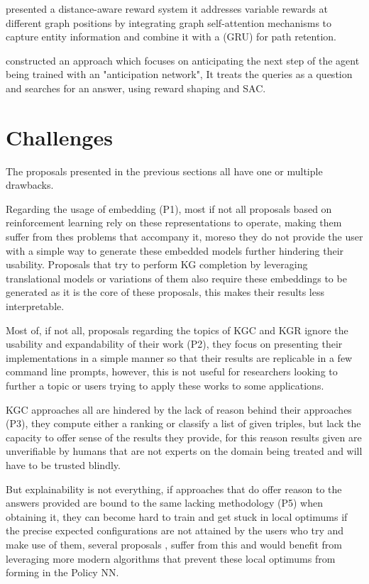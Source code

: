 \citet{tiwari2021dapath} presented a distance-aware reward system it addresses variable rewards at different graph positions by integrating graph self-attention mechanisms to capture entity information and combine it with a (GRU) for path retention.

\citet{cui2023incorporating} constructed an approach which focuses on anticipating the next step of the agent being trained with an "anticipation network", It treats the queries as a question and searches for an answer, using reward shaping and SAC.

\section{Challenges}\label{sec:moti-discussion}

The proposals presented in the previous sections all have one or multiple drawbacks.

Regarding the usage of embedding (P1), most if not all proposals based on reinforcement learning rely on these representations to operate, making them suffer from thes problems that accompany it, moreso they do not provide the user with a simple way to generate these embedded models further hindering their usability. Proposals that try to perform KG completion by leveraging translational models or variations of them also require these embeddings to be generated as it is the core of these proposals, this makes their results less interpretable.

Most of, if not all, proposals regarding the topics of KGC and KGR ignore the usability and expandability of their work (P2), they focus on presenting their implementations in a simple manner so that their results are replicable in a few command line prompts, however, this is not useful for researchers looking to further a topic or users trying to apply these works to some applications.

KGC approaches \cite{nickel2011three, bordes2013translating, wang2014knowledge,vashishth2020interacte} all are hindered by the lack of reason behind their approaches (P3), they compute either a ranking or classify a list of given triples, but lack the capacity to offer sense of the results they provide, for this reason results given are unverifiable by humans that are not experts on the domain being treated and will have to be trusted blindly.

But explainability is not everything, if approaches that do offer reason to the answers provided are bound to the same lacking methodology (P5) when obtaining it, they can become hard to train and get stuck in local optimums if the precise expected configurations are not attained by the users who try and make use of them, several proposals \cite{}, suffer from this and would benefit from leveraging more modern algorithms that prevent these local optimums from forming in the Policy NN.

